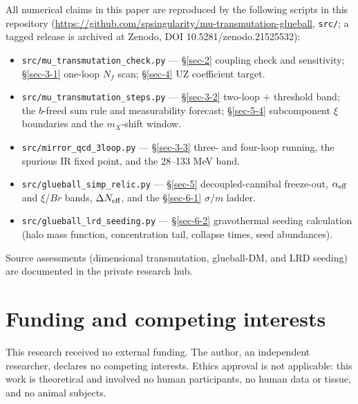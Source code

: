 \documentclass[preprint,12pt]{elsarticle}
\providecommand{\tightlist}{\setlength{\itemsep}{0pt}\setlength{\parskip}{0pt}}
\begin{document}
All numerical claims in this paper are reproduced by the following
scripts in this repository
(\url{https://github.com/spsingularity/mu-transmutation-glueball},
\texttt{src/\allowbreak }; a tagged release is archived at Zenodo, DOI
10.5281/zenodo.21525532):

\begin{itemize}
\tightlist
\item
  \texttt{src/\allowbreak mu\_\allowbreak transmutation\_\allowbreak check.\allowbreak py} --- §\ref{sec-2} coupling
  check and sensitivity; §\ref{sec-3-1} one-loop \(N_f\) scan;
  §\ref{sec-4} UZ coefficient target.
\item
  \texttt{src/\allowbreak mu\_\allowbreak transmutation\_\allowbreak steps.\allowbreak py} --- §\ref{sec-3-2} two-loop +
  threshold band; the \(b\)-freed sum rule and measurability forecast;
  §\ref{sec-5-4} subcomponent \(\xi\) boundaries and the \(m_X\)-shift
  window.
\item
  \texttt{src/\allowbreak mirror\_\allowbreak qcd\_\allowbreak 3loop.\allowbreak py} --- §\ref{sec-3-3} three- and
  four-loop running, the spurious IR fixed point, and the 28--133 MeV
  band.
\item
  \texttt{src/\allowbreak glueball\_\allowbreak simp\_\allowbreak relic.\allowbreak py} --- §\ref{sec-5}
  decoupled-cannibal freeze-out, \(\alpha_{\rm eff}\) and \(\xi\)/\(Br\)
  bands, \(\Delta N_{\rm eff}\), and the §\ref{sec-6-1} \(\sigma/m\)
  ladder.
\item
  \texttt{src/\allowbreak glueball\_\allowbreak lrd\_\allowbreak seeding.\allowbreak py} --- §\ref{sec-6-2} gravothermal
  seeding calculation (halo mass function, concentration tail, collapse
  times, seed abundances).
\end{itemize}

Source assessments (dimensional transmutation, glueball-DM, and LRD
seeding) are documented in the private research hub.

\section*{Funding and competing
interests}\label{funding-and-competing-interests}

This research received no external funding. The author, an independent
researcher, declares no competing interests. Ethics approval is not
applicable: this work is theoretical and involved no human participants,
no human data or tissue, and no animal subjects.
\end{document}
